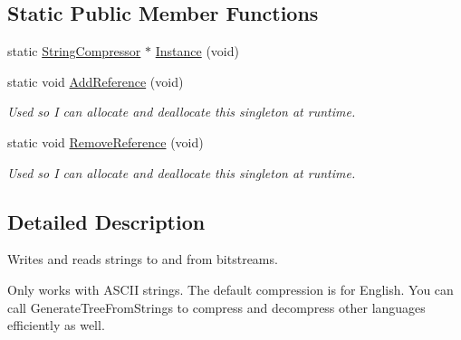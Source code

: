 \subsection*{Static Public Member Functions}
\begin{DoxyCompactItemize}
\item 
static \hyperlink{class_rak_net_1_1_string_compressor}{String\-Compressor} $\ast$ \hyperlink{class_rak_net_1_1_string_compressor_a024d479beb74364c0414d20d8154713b}{Instance} (void)
\item 
\hypertarget{class_rak_net_1_1_string_compressor_ab9b84180fd8150a0af933c1000a8bf02}{static void \hyperlink{class_rak_net_1_1_string_compressor_ab9b84180fd8150a0af933c1000a8bf02}{Add\-Reference} (void)}\label{class_rak_net_1_1_string_compressor_ab9b84180fd8150a0af933c1000a8bf02}

\begin{DoxyCompactList}\small\item\em Used so I can allocate and deallocate this singleton at runtime. \end{DoxyCompactList}\item 
\hypertarget{class_rak_net_1_1_string_compressor_a3ec3ec7c1c29b4687e9706af1a17100d}{static void \hyperlink{class_rak_net_1_1_string_compressor_a3ec3ec7c1c29b4687e9706af1a17100d}{Remove\-Reference} (void)}\label{class_rak_net_1_1_string_compressor_a3ec3ec7c1c29b4687e9706af1a17100d}

\begin{DoxyCompactList}\small\item\em Used so I can allocate and deallocate this singleton at runtime. \end{DoxyCompactList}\end{DoxyCompactItemize}


\subsection{Detailed Description}
Writes and reads strings to and from bitstreams. 

Only works with A\-S\-C\-I\-I strings. The default compression is for English. You can call Generate\-Tree\-From\-Strings to compress and decompress other languages efficiently as well. 

